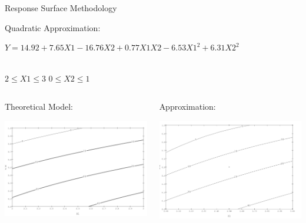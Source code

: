 \documentclass[14pt]{beamer}
\begin{document}
\begin{frame}{Response Surface Methodology}

Quadratic Approximation: \\
{\small $Y = 14.92+7.65X1  -16.76X2 + 0.77X1X2  -6.53X1^2+6.31X2^2$ \\

\ \\
\begin{center}$2 \leq X1 \leq 3$ \hspace{2cm} $0\leq X2\leq1$\end{center}}
\pause
\begin{columns}
    \begin{column}{0.5\textwidth}
    Theoretical Model:

      \includegraphics[width=1.1\textwidth]{actualgraph.png}
    \end{column}
    \pause
    \begin{column}{0.5\textwidth}
      Approximation:

      \includegraphics[width=1.1\textwidth]{modelgraph.png}
    \end{column}
  \end{columns}

\end{frame}
\end{document}
